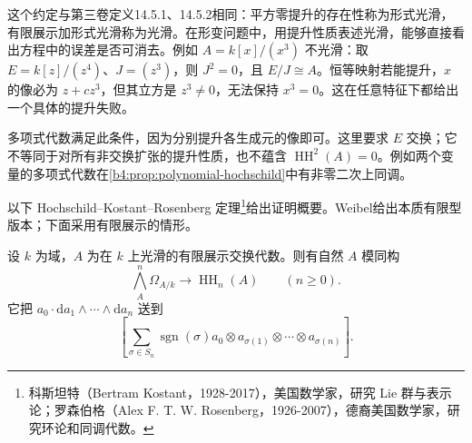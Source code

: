 这个约定与第三卷定义14.5.1、14.5.2相同：平方零提升的存在性称为形式光滑，有限展示加形式光滑称为光滑。在形变问题中，用提升性质表述光滑，能够直接看出方程中的误差是否可消去。例如 \(A=k[x]/(x^3)\) 不光滑：取 \(E=k[z]/(z^4)\)、\(J=(z^3)\)，则 \(J^2=0\)，且 \(E/J\cong A\)。恒等映射若能提升，\(x\) 的像必为 \(z+c z^3\)，但其立方是 \(z^3\ne0\)，无法保持 \(x^3=0\)。这在任意特征下都给出一个具体的提升失败。

\ProseParagraphBreak
多项式代数满足此条件，因为分别提升各生成元的像即可。这里要求 \(E\) 交换；它不等同于对所有非交换扩张的提升性质，也不蕴含 \(\operatorname{HH}^2(A)=0\)。例如两个变量的多项式代数在\cref{b4:prop:polynomial-hochschild}中有非零二次上同调。

\ProseParagraphBreak
以下 Hochschild--Kostant--Rosenberg 定理\footnote{科斯坦特（Bertram Kostant，1928-2017），美国数学家，研究 Lie 群与表示论；罗森伯格（Alex F. T. W. Rosenberg，1926-2007），德裔美国数学家，研究环论和同调代数。}给出证明概要。Weibel\cite[Theorem 9.4.7]{Weibel1994HomologicalAlgebra}给出本质有限型版本；下面采用有限展示的情形。

\begin{theorem}\label{b4:thm:hkr-external}
	设 \(k\) 为域，\(A\) 为在 \(k\) 上光滑的有限展示交换代数。则有自然 \(A\) 模同构
	\[
		\bigwedge_A^n\Omega_{A/k}\longrightarrow\operatorname{HH}_n(A) \qquad(n\ge0).
	\]
	它把 \(a_0\cdot\mathrm{d}a_1\wedge\cdots\wedge \mathrm{d}a_n\) 送到
	\[
		\left[\sum_{\sigma\in S_n}\operatorname{sgn}(\sigma) a_0\otimes a_{\sigma(1)}\otimes\cdots\otimes a_{\sigma(n)}\right].
	\]
\end{theorem}


